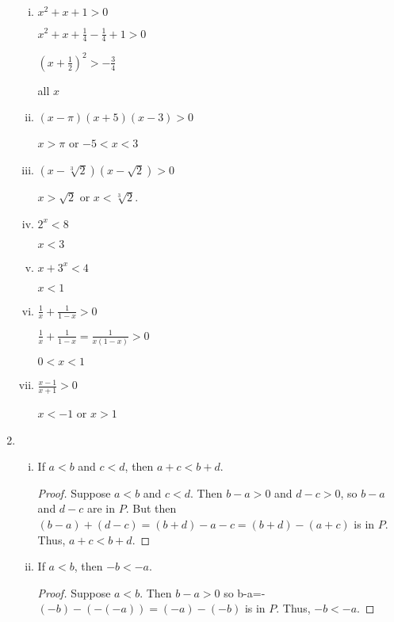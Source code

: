 \documentclass{amsart}
\begin{document}
\begin{enumerate}[1.]
\begin{enumerate}[(i)]
    \item $x^{2}+x+1>0$

      $x^{2}+x+\frac{1}{4}-\frac{1}{4}+1>0$

      $(x+\frac{1}{2})^{2}>-\frac{3}{4}$

      all $x$

    \item $(x- \pi )(x+5)(x-3)>0$

      $x>\pi$ or $-5<x<3$

    \item $(x-\sqrt[3]{2})(x-\sqrt{2})>0$

      $x>\sqrt{2}$ or $x<\sqrt[3]{2}$.

    \item $2^{x}<8$

      $x<3$
    \item $x+3^{x}<4$

      $x<1$

    \item $\frac{1}{x}+\frac{1}{1-x}>0$

      $\frac{1}{x}+\frac{1}{1-x}=\frac{1}{x(1-x)}>0$

      $0<x<1$

    \item $\frac{x-1}{x+1}>0$

      $x<-1$ or $x>1$
    \end{enumerate}

  \item
    \begin{enumerate}[(i)]
    \item If $a<b$ and $c<d$, then $a+c<b+d$.
      \begin{proof}
        Suppose $a<b$ and $c<d$. Then $b-a>0$ and $d-c>0$, so $b-a$ and $d-c$ are in $P$. But then $(b-a)+(d-c)=(b+d)-a-c=(b+d)-(a+c)$ is in $P$. Thus, $a+c<b+d$.
      \end{proof}
    \item If $a<b$, then $-b<-a$.
      \begin{proof}
        Suppose $a<b$. Then $b-a>0$ so b-a=-$(-b)-(-(-a))=(-a)-(-b)$ is in $P$. Thus, $-b<-a$.
      \end{proof}


\end{enumerate}
\end{enumerate}
\end{document}
